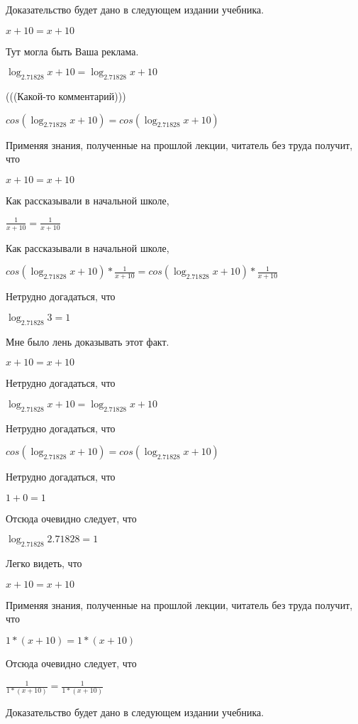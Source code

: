 \documentclass[12pt,a4paper,fleqn]{article}
\theoremstyle{definition}
\begin{document}
Доказательство будет дано в следующем издании учебника. 

$ x  +  10  =  x  +  10 $

Тут могла быть Ваша реклама. 

$\log_{ 2.71828 }{ x  +  10 } = \log_{ 2.71828 }{ x  +  10 }$

(((Какой-то комментарий))) 

$cos(\log_{ 2.71828 }{ x  +  10 }) = cos(\log_{ 2.71828 }{ x  +  10 })$

Применяя знания, полученные на прошлой лекции, читатель без труда получит, что 

$ x  +  10  =  x  +  10 $

Как рассказывали в начальной школе, 

$\frac{ 1 }{ x  +  10 }
 = \frac{ 1 }{ x  +  10 }
$

Как рассказывали в начальной школе, 

$cos(\log_{ 2.71828 }{ x  +  10 }) * \frac{ 1 }{ x  +  10 }
 = cos(\log_{ 2.71828 }{ x  +  10 }) * \frac{ 1 }{ x  +  10 }
$

Нетрудно догадаться, что 

$\log_{ 2.71828 }{ 3 } =  1 $

Мне было лень доказывать этот факт.

$ x  +  10  =  x  +  10 $

Нетрудно догадаться, что 

$\log_{ 2.71828 }{ x  +  10 } = \log_{ 2.71828 }{ x  +  10 }$

Нетрудно догадаться, что 

$cos(\log_{ 2.71828 }{ x  +  10 }) = cos(\log_{ 2.71828 }{ x  +  10 })$

Нетрудно догадаться, что 

$ 1  +  0  =  1 $

Отсюда очевидно следует, что 

$\log_{ 2.71828 }{ 2.71828 } =  1 $

Легко видеть, что 

$ x  +  10  =  x  +  10 $

Применяя знания, полученные на прошлой лекции, читатель без труда получит, что 

$ 1  * ( x  +  10 ) =  1  * ( x  +  10 )$

Отсюда очевидно следует, что 

$\frac{ 1 }{ 1  * ( x  +  10 )}
 = \frac{ 1 }{ 1  * ( x  +  10 )}
$

Доказательство будет дано в следующем издании учебника. 
\end{document}
